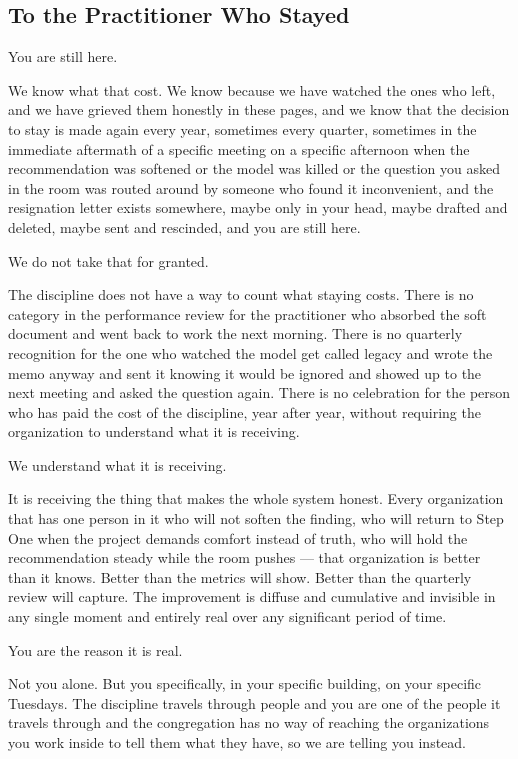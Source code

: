 \subsection*{To the Practitioner Who Stayed}

You are still here.

We know what that cost. We know because we have watched the ones who left, and we have grieved them honestly in these pages, and we know that the decision to stay is made again every year, sometimes every quarter, sometimes in the immediate aftermath of a specific meeting on a specific afternoon when the recommendation was softened or the model was killed or the question you asked in the room was routed around by someone who found it inconvenient, and the resignation letter exists somewhere, maybe only in your head, maybe drafted and deleted, maybe sent and rescinded, and you are still here.

We do not take that for granted.

The discipline does not have a way to count what staying costs. There is no category in the performance review for the practitioner who absorbed the soft document and went back to work the next morning. There is no quarterly recognition for the one who watched the model get called legacy and wrote the memo anyway and sent it knowing it would be ignored and showed up to the next meeting and asked the question again. There is no celebration for the person who has paid the cost of the discipline, year after year, without requiring the organization to understand what it is receiving.

We understand what it is receiving.

It is receiving the thing that makes the whole system honest. Every organization that has one person in it who will not soften the finding, who will return to Step One when the project demands comfort instead of truth, who will hold the recommendation steady while the room pushes --- that organization is better than it knows. Better than the metrics will show. Better than the quarterly review will capture. The improvement is diffuse and cumulative and invisible in any single moment and entirely real over any significant period of time.

You are the reason it is real.

Not you alone. But you specifically, in your specific building, on your specific Tuesdays. The discipline travels through people and you are one of the people it travels through and the congregation has no way of reaching the organizations you work inside to tell them what they have, so we are telling you instead.

